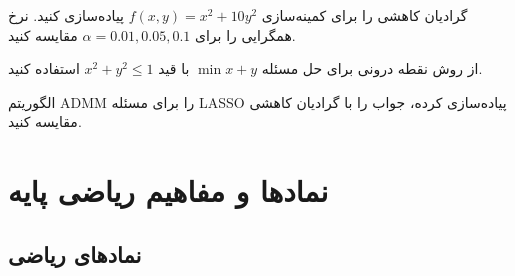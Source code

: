 \documentclass{matinbook}
\begin{document}
    \begin{exercise}
        گرادیان کاهشی را برای کمینه‌سازی
        $f(x, y) = x^{2} + 10y^{2}$
        پیاده‌سازی کنید.
        نرخ همگرایی را برای
        $\alpha = 0.01, 0.05, 0.1$ مقایسه کنید.
        \label{exc:gd-ill-conditioned}
    \end{exercise}
    
    \begin{exercise}
        از روش نقطه درونی برای حل
        مسئله $\min x + y$ با قید
        $x^{2} + y^{2} \leq 1$ استفاده کنید.
        \label{exc:interior-point}
    \end{exercise}
    
    \begin{exercise}
        الگوریتم ADMM را برای
        مسئله LASSO پیاده‌سازی کرده،
        جواب را با گرادیان کاهشی
        مقایسه کنید.
        \label{exc:admm-lasso}
    \end{exercise}
    
    
    
    \appendix
    
    \chapter{نمادها و مفاهیم ریاضی پایه}
    \label{app:notation}
    
    \section{نمادهای ریاضی}
    
\end{document}
